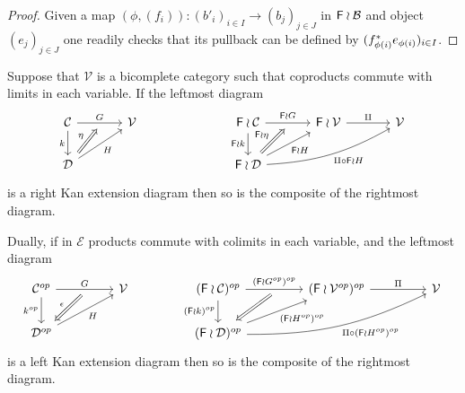 \documentclass[a4paper,10pt]{article}%
\begin{document}
\begin{proof}
Given a map 
$(\phi,(f_i)) \colon
(b'_i)_{i \in I} \to (b_j)_{j \in J}$ 
in $\mathsf{F} \wr \mathcal{B}$
and object $(e_j)_{j \in J}$ one readily checks that its pullback can be defined by $(f^{\**}_{\phi(i)}e_{\phi(i)})_{i \in I}$.
\end{proof}


\begin{lemma}\label{FINWREATPRODLIM LEM}
Suppose that $\mathcal{V}$ is a bicomplete category such that 
coproducts commute with limits in each variable. If the leftmost diagram
\begin{equation}\label{WRRAN EQ}
	\begin{tikzcd}[column sep = 3.5em]
	\mathcal{C} \ar{r}[swap,name=F]{}{G} \ar{d}[swap]{k} &
	\mathcal{V} & 
	& 
	\Fin \wr \mathcal{C} \ar{r}[swap,name=FF]{}{\Fin \wr G} \ar{d}[swap]{\Fin \wr k}&
	\Fin \wr \mathcal{V} \ar{r}{\amalg} &
	\mathcal{V}
		\\
	|[alias=D]|\mathcal{D} \ar{ru}[swap]{H} &
	& & 
	|[alias=FD]|\Fin \wr \mathcal{D} \ar{ru}[swap]{\Fin \wr H}
	\ar[bend right=13]{rru}[swap]{\amalg \circ \Fin \wr H}
	\arrow[Rightarrow, from=D, to=F,shorten <=0.10cm,"\eta"]
	\arrow[Rightarrow, from=FD, to=FF,shorten <=0.10cm,"\Fin \wr \eta"]
	\end{tikzcd}
\end{equation}
is a right Kan extension diagram then so is the composite of the rightmost diagram. 

Dually, if in $\mathcal{E}$ products commute with colimits in each variable, and the leftmost diagram
\begin{equation}\label{WRLAN EQ}
	\begin{tikzcd}[column sep = 4.5em]
	\mathcal{C}^{op} \ar{r}[swap,name=F]{}{G} \ar{d}[swap]{k^{op}} & 
	\mathcal{V} & 
	(\Fin \wr \mathcal{C})^{op} \ar{d}[swap]{(\Fin \wr k)^{op}} 
	\ar{r}[swap,name=FF]{}{(\Fin \wr G^{op})^{op}} & 
	(\Fin \wr \mathcal{V}^{op})^{op} \ar{r}{\Pi} &
	\mathcal{V}
\\
	|[alias=D]|\mathcal{D}^{op} \ar{ru}[swap]{H} &
	& 
	|[alias=FD]|(\Fin \wr \mathcal{D})^{op} 
	\ar{ru}[swap]{(\Fin \wr H^{op})^{op}}
	\ar[bend right=13]{rru}[swap]{\Pi \circ (\Fin \wr H^{op})^{op}}
	&
	\arrow[Leftarrow, from=D, to=F,shorten <=0.10cm,"\epsilon"]
	\arrow[Leftarrow, from=FD, to=FF,shorten <=0.10cm]
	\end{tikzcd}
\end{equation}
is a left Kan extension diagram then so is the composite of the rightmost diagram. 
\end{lemma}
\end{document}

